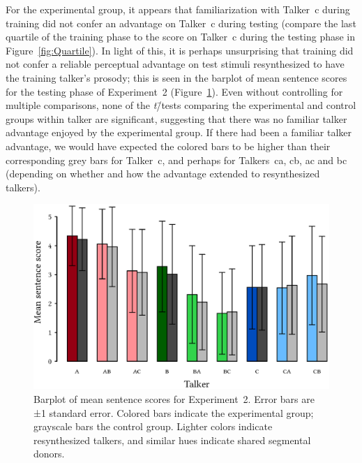 For the experimental group, it appears that familiarization with Talker~\ac{c} during training did not confer an advantage on Talker~\ac{c} during testing (compare the last quartile of the training phase to the score on Talker~\ac{c} during the testing phase in Figure~\ref{fig:Quartile}).  %
In light of this, it is perhaps unsurprising that training did not confer a reliable perceptual advantage on test stimuli resynthesized to have the training talker’s prosody; this is seen in the barplot of mean sentence scores for the testing phase of Experiment~2 (Figure~\ref{fig:ExpTwoBarplot}).  Even without controlling for multiple comparisons, none of the \textit{t}\=/tests comparing the experimental and control groups within talker are significant, suggesting that there was no familiar talker advantage enjoyed by the experimental group.  If there had been a familiar talker advantage, we would have expected the colored bars to be higher than their corresponding grey bars for Talker~\ac{c}, and perhaps for Talkers~\ac{ca}, \ac{cb}, \ac{ac} and \ac{bc} (depending on whether and how the advantage extended to resynthesized talkers).

\begin{figure}
	\begin{centering}
	\includegraphics{figures/results/ExpTwoBarplot.eps}
	\caption[Barplot of mean sentence scores for Experiment~2]{Barplot of mean sentence scores for Experiment~2.  Error bars are ±1 standard error.  Colored bars indicate the experimental group; grayscale bars the control group.  Lighter colors indicate resynthesized talkers, and similar hues indicate shared segmental donors.\label{fig:ExpTwoBarplot}}
	\end{centering}
\end{figure}

